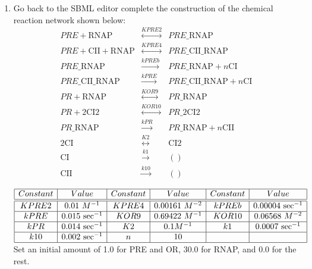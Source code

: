 \documentclass[titlepage,11pt]{article}
\begin{document}
\begin{enumerate}
\item Go back to the SBML editor complete the construction of the
      chemical reaction network shown below:
\begin{eqnarray*}
PRE + \mathrm{RNAP} & \stackrel{KPRE2}{\longleftrightarrow} &
PRE\_\mathrm{RNAP} \\
PRE + \mathrm{CII} + \mathrm{RNAP} &
\stackrel{KPRE4}{\longleftrightarrow} &
PRE\_\mathrm{CII}\_\mathrm{RNAP} \\
PRE\_\mathrm{RNAP} & \stackrel{kPREb}{\longrightarrow} & 
PRE\_\mathrm{RNAP} + n\mathrm{CI} \\
PRE\_\mathrm{CII}\_\mathrm{RNAP} 
& \stackrel{kPRE}{\longrightarrow} & 
PRE\_\mathrm{CII}\_\mathrm{RNAP} + n\mathrm{CI} \\
PR + \mathrm{RNAP} & \stackrel{KOR9}{\longleftrightarrow} &
PR\_\mathrm{RNAP} \\
PR + 2 \mathrm{CI2} & \stackrel{KOR10}{\longleftrightarrow} &
PR\_2 \mathrm{CI2} \\
PR\_\mathrm{RNAP} & \stackrel{kPR}{\longrightarrow} & 
PR\_\mathrm{RNAP} + n\mathrm{CII} \\
2 \mathrm{CI} & \stackrel{K2}{\longleftrightarrow} & \mathrm{CI2} \\
\mathrm{CI} & \stackrel{k1}{\longrightarrow} & () \\ 
\mathrm{CII} & \stackrel{k10}{\longrightarrow} & ()
\end{eqnarray*}

\begin{center}
\begin{math}
\begin{array}{|c|c|c|c|c|c|}
\hline
Constant & Value & Constant & Value & Constant & Value \\ \hline \hline
KPRE2  & 0.01~M^{-1} & KPRE4  & 0.00161~M^{-2} & 
kPREb  & 0.00004~\mathrm{sec}^{-1} \\ \hline
kPRE   & 0.015~\mathrm{sec}^{-1} &
KOR9  & 0.69422~M^{-1} & KOR10  & 0.06568~M^{-2} \\ \hline
kPR    & 0.014~\mathrm{sec}^{-1} &
K2       & 0.1 M^{-1} & k1       & 0.0007~\mathrm{sec}^{-1} \\ \hline
k10    & 0.002~\mathrm{sec}^{-1} & n         & 10 & ~ & ~ \\ \hline
\end{array}
\end{math} \\
Set an initial amount of 1.0 for PRE and OR, 30.0 for RNAP, and 0.0 
for the rest.
\end{center}
\end{enumerate}
\end{document}
